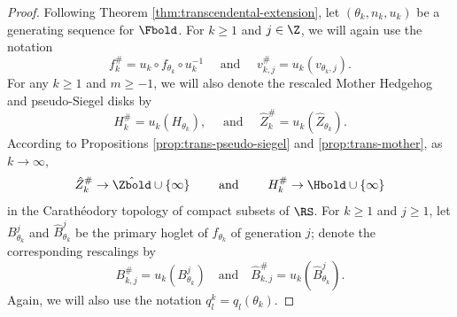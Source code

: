 \documentclass{amsart}
\begin{document}
\begin{proof}
    Following Theorem \ref{thm:transcendental-extension}, let $(\theta_k,n_k,u_k)$ be a generating sequence for $\Fbold$.
    For $k \geq 1$ and $j \in \Z$, we will again use the notation
    \[
        f^{\#}_k = u_k \circ f_{\theta_k} \circ u_k^{-1}
        \quad \text{ and } \quad
        v^{\#}_{k,j} = u_k(v_{\theta_k,j}).
    \]
    For any $k \geq 1$ and $m \geq -1$, we will also denote the rescaled Mother Hedgehog and pseudo-Siegel disks by
    \[
        H^{\#}_k = u_k(H_{\theta_k}),
        \quad \text{ and } \quad
        \hat{Z}^{\#}_k = u_k(\hat{Z}_{\theta_k}).
    \]
    According to Propositions \ref{prop:trans-pseudo-siegel} and \ref{prop:trans-mother}, as $k \to \infty$,
    \begin{equation}
    \label{eqn:z-and-h-convergence}
        \hat{Z}_k^{\#} \to \hat{\Zbold} \cup \{\infty\}
        \qquad \text{ and } \qquad 
        H_k^{\#} \to \Hbold \cup \{\infty\}
    \end{equation}
    in the Carath\'eodory topology of compact subsets of $\RS$.
    For $k \geq 1$ and $j \geq 1$, let $B_{\theta_k}^j$ and $\hat{B}_{\theta_k}^j$ be the primary hoglet of $f_{\theta_k}$ of generation $j$; denote the corresponding rescalings by
    \[
    B_{k,j}^{\#} = u_k(B_{\theta_k}^j)
    \quad \text{and} \quad
    \hat{B}_{k,j}^{\#} = u_k(\hat{B}_{\theta_k}^j).
    \]
    Again, we will also use the notation $q^k_l = q_l(\theta_k)$.
    

\end{proof}
\end{document}
